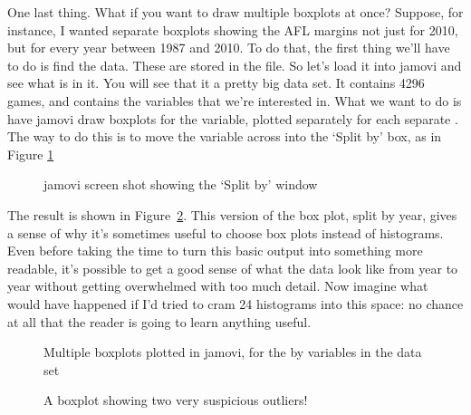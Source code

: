
One last thing. What if you want to draw multiple boxplots at once? Suppose, for instance, I wanted separate boxplots showing the AFL margins not just for 2010, but for every year between 1987 and 2010. To do that, the first thing we'll have to do is find the data. These are stored in the  file. So let's load it into jamovi and see what is in it. You will see that it a pretty big data set. It contains 4296 games, and contains the variables that we're interested in. What we want to do is have jamovi draw boxplots for the  variable, plotted separately for each separate . The way to do this is to move the  variable across into the `Split by' box, as in Figure \ref{fig:splitfile1}

\begin{figure}[ht]
\begin{center}
\caption{jamovi screen shot showing the `Split by' window}
\label{fig:splitfile1}
\HR
\end{center}
\end{figure}

The result is shown in Figure~\ref{fig:boxplot3}. This version of the box plot, split by year, gives a sense of why it's sometimes useful to choose box plots instead of histograms. Even before taking the time to turn this basic output into something more readable, it's possible to get a good sense of what the data look like from year to year without getting overwhelmed with too much detail. Now imagine what would have happened if I'd tried to cram 24 histograms into this space: no chance at all that the reader is going to learn anything useful.

\begin{figure}[ht]
\begin{center}
\caption{Multiple boxplots plotted in jamovi, for the  by  variables in the  data set}
\label{fig:boxplot3}
\HR
\end{center}
\end{figure}



\begin{figure}[ht]
\begin{center}
\caption{A boxplot showing two very suspicious outliers!}
\label{fig:boxplot4}
\HR
\end{center}
\end{figure}

